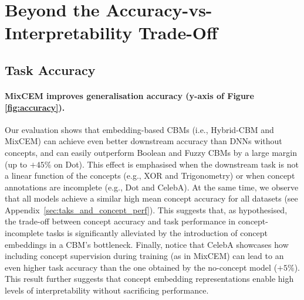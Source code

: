 \section{Beyond the Accuracy-vs-Interpretability Trade-Off}
\subsection{Task Accuracy}

\paragraph{MixCEM improves generalisation accuracy (y-axis of Figure \ref{fig:accuracy}).}
Our evaluation shows that embedding-based CBMs (i.e., Hybrid-CBM and MixCEM) can achieve even better downstream accuracy than DNNs without concepts, and can easily outperform Boolean and Fuzzy CBMs by a large margin (up to $+45\%$ on Dot). This effect is emphasised when the downstream task is not a linear function of the concepts (e.g., XOR and Trigonometry) or when concept annotations are incomplete (e.g., Dot and CelebA). At the same time, we observe that all models achieve a similar high mean concept accuracy for all datasets (see Appendix~\ref{sec:taks_and_concept_perf}). This suggests that, as hypothesised, the trade-off between concept accuracy and task performance in concept-incomplete tasks is significantly alleviated by the introduction of concept embeddings in a CBM's bottleneck. Finally, notice that CelebA showcases how including concept supervision during training (as in MixCEM) can lead to an even higher task accuracy than the one obtained by the no-concept model ($+5\%$). This result further suggests that concept embedding representations enable high levels of interpretability without sacrificing performance.


